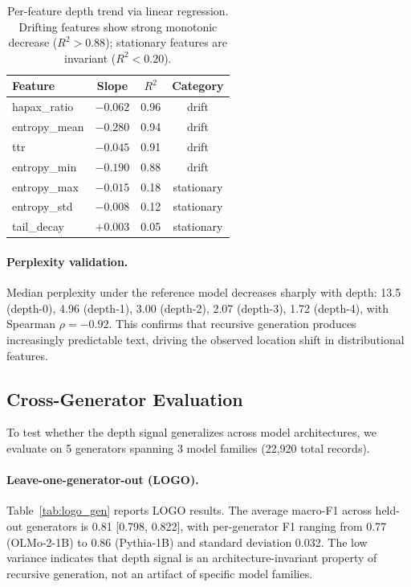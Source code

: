 \documentclass[11pt,a4paper]{article}
\begin{document}
\begin{table}[t]
\centering
\caption{Per-feature depth trend via linear regression. Drifting features show strong monotonic decrease ($R^2 > 0.88$); stationary features are invariant ($R^2 < 0.20$).}
\label{tab:trends}
\begin{tabular}{lccc}
\toprule
Feature & Slope & $R^2$ & Category \\
\midrule
hapax\_ratio & $-0.062$ & 0.96 & drift \\
entropy\_mean & $-0.280$ & 0.94 & drift \\
ttr & $-0.045$ & 0.91 & drift \\
entropy\_min & $-0.190$ & 0.88 & drift \\
\midrule
entropy\_max & $-0.015$ & 0.18 & stationary \\
entropy\_std & $-0.008$ & 0.12 & stationary \\
tail\_decay & $+0.003$ & 0.05 & stationary \\
\bottomrule
\end{tabular}
\end{table}

\paragraph{Perplexity validation.} Median perplexity under the reference model decreases sharply with depth: 13.5 (depth-0), 4.96 (depth-1), 3.00 (depth-2), 2.07 (depth-3), 1.72 (depth-4), with Spearman $\rho = -0.92$. This confirms that recursive generation produces increasingly predictable text, driving the observed location shift in distributional features.

\subsection{Cross-Generator Evaluation}
\label{sec:cross_gen}

To test whether the depth signal generalizes across model architectures, we evaluate on 5 generators spanning 3 model families (22{,}920 total records).

\paragraph{Leave-one-generator-out (LOGO).} Table~\ref{tab:logo_gen} reports LOGO results. The average macro-F1 across held-out generators is 0.81 [0.798, 0.822], with per-generator F1 ranging from 0.77 (OLMo-2-1B) to 0.86 (Pythia-1B) and standard deviation 0.032. The low variance indicates that depth signal is an architecture-invariant property of recursive generation, not an artifact of specific model families.
\end{document}
